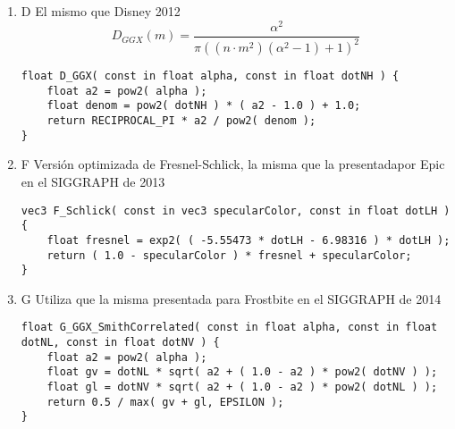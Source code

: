             \begin{enumerate}
            \item D
                El mismo que Disney 2012 \autocite{disney12}
            $$D_{GGX}(m) = \frac{\alpha^2}{\pi((n\cdotp{m^2})(\alpha^2 - 1 ) + 1)^2}$$
            \singlespacing
            \begin{lstlisting}[caption=My Javascript Example]
float D_GGX( const in float alpha, const in float dotNH ) {
    float a2 = pow2( alpha );
    float denom = pow2( dotNH ) * ( a2 - 1.0 ) + 1.0;
    return RECIPROCAL_PI * a2 / pow2( denom );
}
            \end{lstlisting}
            \singlespacing
            \item F
                Versi\'on optimizada de Fresnel-Schlick, la misma que la presentadapor Epic en
                el SIGGRAPH de 2013\autocite{unreal}
            \singlespacing
            \begin{lstlisting}[caption=My Javascript Example]
vec3 F_Schlick( const in vec3 specularColor, const in float dotLH ) {
    float fresnel = exp2( ( -5.55473 * dotLH - 6.98316 ) * dotLH );
    return ( 1.0 - specularColor ) * fresnel + specularColor;
}
            \end{lstlisting}
            \singlespacing
            \item G
                Utiliza que la misma presentada para Frostbite en el SIGGRAPH de 2014\autocite{frostbite}
            \singlespacing
            \begin{lstlisting}[caption=My Javascript Example]
float G_GGX_SmithCorrelated( const in float alpha, const in float dotNL, const in float dotNV ) {
    float a2 = pow2( alpha );
    float gv = dotNL * sqrt( a2 + ( 1.0 - a2 ) * pow2( dotNV ) );
    float gl = dotNV * sqrt( a2 + ( 1.0 - a2 ) * pow2( dotNL ) );
    return 0.5 / max( gv + gl, EPSILON );
}
            \end{lstlisting}
            \singlespacing
            \end{enumerate}

